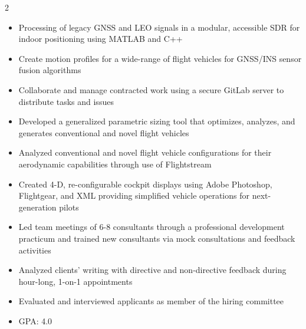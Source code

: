 \documentclass[10pt,a4paper,ragged2e,withhyper]{altacv}
\begin{document}
\begin{paracol}{2}

  \begin{itemize}
    \item{Processing of legacy GNSS and LEO signals in a modular, accessible SDR for indoor positioning using MATLAB and C++}
    \item{Create motion profiles for a wide-range of flight vehicles for GNSS/INS sensor fusion algorithms}
    \item{Collaborate and manage contracted work using a secure GitLab server to distribute tasks and issues}
  \end{itemize}
  \divider
  \begin{itemize}
    \item{Developed a generalized parametric sizing tool that optimizes, analyzes, and generates conventional and novel flight vehicles}
    \item{Analyzed conventional and novel flight vehicle configurations for their aerodynamic capabilities through use of Flightstream}
    \item{Created 4-D, re-configurable cockpit displays using Adobe Photoshop, Flightgear, and XML providing simplified vehicle operations for next-generation pilots}
  \end{itemize}
  \divider
  \begin{itemize}
    \item{Led team meetings of 6-8 consultants through a professional development practicum and trained new consultants via mock consultations and feedback activities}
    \item{Analyzed clients' writing with directive and non-directive feedback during hour-long, 1-on-1 appointments}
    \item{Evaluated and interviewed applicants as member of the hiring committee}
  \end{itemize}

  \begin{itemize}
    \item GPA: 4.0
  \end{itemize}
  \divider


  \nocite{*}

  \printbibliography[heading=pubtype,title={\printinfo{\faUsers}{Conference Proceedings}},type=inproceedings]

\end{paracol}
\end{document}
